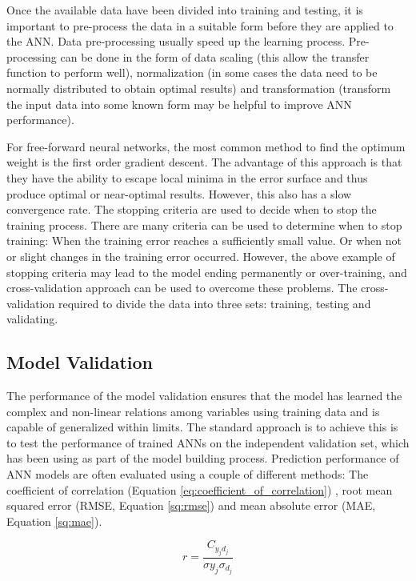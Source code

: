Once the available data have been divided into training and testing, it is important to pre-process the data in a suitable form before they are applied to the ANN. Data pre-processing usually speed up the learning process. Pre-processing can be done in the form of data scaling (this allow the transfer function to perform well), normalization (in some cases the data need to be normally distributed to obtain optimal results) and transformation (transform the input data into some known form may be helpful to improve ANN performance). 


For free-forward neural networks, the most common method to find the optimum weight is the first order gradient descent. The advantage of this approach is that they have the ability to escape local minima in the error surface and thus produce optimal or near-optimal results. However, this also has a slow convergence rate. The stopping criteria are used to decide when to stop the training process. There are many criteria can be used to determine when to stop training: When the training error reaches a sufficiently small value. Or when not or slight changes in the training error occurred. However, the above example of stopping criteria may lead to the model ending permanently or over-training, and cross-validation approach can be used to overcome these problems. The cross-validation required to divide the data into three sets: training, testing and validating. 
 
\subsection{Model Validation}
The performance of the model validation ensures that the model has learned the complex and non-linear relations among variables using training data and is capable of generalized within limits. The standard approach is to achieve this is to test the performance of trained ANNs on the independent validation set, which has been using as part of the model building process. Prediction performance of ANN models are often evaluated using a couple of different methods: The coefficient of correlation (Equation \ref{eq:coefficient_of_correlation}) , root mean squared error (RMSE, Equation \ref{sq:rmse}) and mean absolute error (MAE, Equation \ref{sq:mae}).

\begin{equation}
r = \frac{C_{y_{j} d_{j}}}{\sigma{y_{j}\sigma_{d_{j}}}}
\label{eq:coefficient_of_correlation}
\end{equation}

